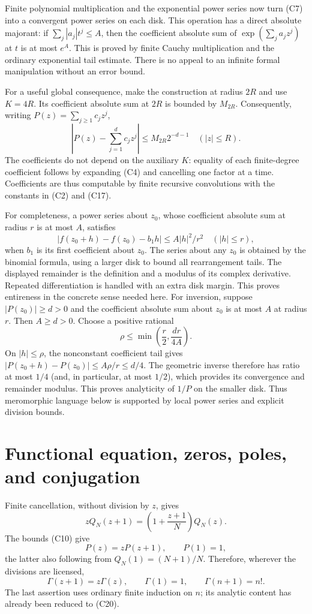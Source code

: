 Finite polynomial multiplication and the exponential power series now
turn (C7) into a convergent power series on each disk.  This operation has
a direct absolute majorant: if $\sum_j|a_j|t^j\leq A$, then the
coefficient absolute sum of $\exp(\sum_j a_jz^j)$ at $t$ is at most
$e^A$.  This is proved by finite Cauchy multiplication and the ordinary
exponential tail estimate.  There is no appeal to an infinite formal
manipulation without an error bound.

For a useful global consequence, make the construction at radius $2R$
and use $K=4R$.  Its coefficient absolute sum at $2R$ is bounded by
$M_{2R}$.  Consequently, writing $P(z)=\sum_{j\geq1}c_jz^j$,
\[
 \left|P(z)-\sum_{j=1}^d c_jz^j\right|
 \leq M_{2R}2^{-d-1}\quad(|z|\leq R).
 \tag{C19}
\]
The coefficients do not depend on the auxiliary $K$: equality of each
finite-degree coefficient follows by expanding (C4) and cancelling one
factor at a time.  Coefficients are thus computable by finite recursive
convolutions with the constants in (C2) and (C17).

For completeness, a power series about $z_0$, whose coefficient absolute
sum at radius $r$ is at most $A$, satisfies
\[
 |f(z_0+h)-f(z_0)-b_1h|\leq A|h|^2/r^2
 \quad(|h|\leq r),
\]
when $b_1$ is its first coefficient about $z_0$.
The series about any $z_0$ is obtained by the binomial formula, using a
larger disk to bound all rearrangement tails.  The displayed remainder
is the definition and a modulus of its complex derivative.  Repeated
differentiation is handled with an extra disk margin.  This proves
entireness in the concrete sense needed here.  For inversion, suppose
$|P(z_0)|\geq d>0$ and the coefficient absolute sum about $z_0$ is at
most $A$ at radius $r$.  Then $A\geq d>0$.  Choose a positive rational
\[
 \rho\leq\min\left(\frac r2,\frac{dr}{4A}\right).
\]
On $|h|\leq\rho$, the nonconstant coefficient tail gives
$|P(z_0+h)-P(z_0)|\leq A\rho/r\leq d/4$.
The geometric inverse therefore has ratio at most $1/4$ (and, in
particular, at most $1/2$), which provides its convergence and remainder
modulus.  This proves analyticity of $1/P$ on the smaller disk.  Thus
meromorphic language below is supported by local power series and
explicit division bounds.

\section{Functional equation, zeros, poles, and conjugation}

Finite cancellation, without division by $z$, gives
\[
 zQ_N(z+1)=\left(1+\frac{z+1}{N}\right)Q_N(z).
\]
The bounds (C10) give
\[
 P(z)=zP(z+1),\qquad P(1)=1,
 \tag{C20}
\]
the latter also following from $Q_N(1)=(N+1)/N$.  Therefore, wherever
the divisions are licensed,
\[
 \Gamma(z+1)=z\Gamma(z),\qquad\Gamma(1)=1,\qquad
 \Gamma(n+1)=n!.
 \tag{C21}
\]
The last assertion uses ordinary finite induction on $n$; its analytic
content has already been reduced to (C20).

